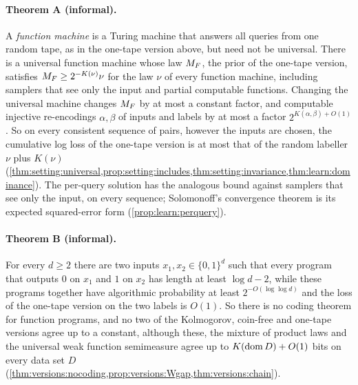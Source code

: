 \paragraph{Theorem A (informal).} A \emph{function machine} is a Turing machine that answers all queries from one random tape, as in the one-tape version above, but need not be universal. There is a universal function machine whose law $M_{F}$, the prior of the one-tape version, satisfies $M_{F}\ge2^{-K(\nu)}\nu$ for the law $\nu$ of every function machine, including samplers that see only the input and partial computable functions. Changing the universal machine changes $M_{F}$ by at most a constant factor, and computable injective re-encodings $\alpha,\beta$ of inputs and labels by at most a factor $2^{K(\alpha,\beta)+O(1)}$. So on every consistent sequence of pairs, however the inputs are chosen, the cumulative log loss of the one-tape version is at most that of the random labeller $\nu$ plus $K(\nu)$ (\cref{thm:setting:universal,prop:setting:includes,thm:setting:invariance,thm:learn:dominance}). The per-query solution has the analogous bound against samplers that see only the input, on every sequence; Solomonoff's convergence theorem is its expected squared-error form (\cref{prop:learn:perquery}).

\paragraph{Theorem B (informal).} For every $d\ge2$ there are two inputs $x_1,x_2\in\{0,1\}^d$ such that every program that outputs $0$ on $x_1$ and $1$ on $x_2$ has length at least $\log d-2$, while these programs together have algorithmic probability at least $2^{-O(\log\log d)}$ and the loss of the one-tape version on the two labels is $O(1)$. So there is no coding theorem for function programs, and no two of the Kolmogorov, coin-free and one-tape versions agree up to a constant, although these, the mixture of product laws and the universal weak function semimeasure agree up to $K(\operatorname{dom} D)+O(1)$ bits on every data set $D$
(\cref{thm:versions:nocoding,prop:versions:Wgap,thm:versions:chain}).

